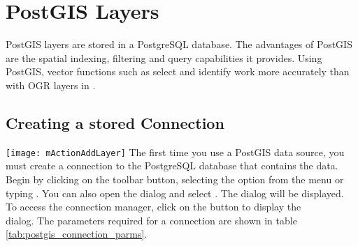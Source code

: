 \section{PostGIS Layers}
\label{label_postgis}

PostGIS layers are stored in a PostgreSQL database. The advantages of PostGIS
are the spatial indexing, filtering and query capabilities it provides. Using PostGIS,
vector functions such as select and identify work more accurately than with
OGR layers in \qg.

\subsection{Creating a stored
Connection}\label{sec:postgis_stored}

\texttt{[image: mActionAddLayer]} The first time
you use a PostGIS data source, you must create a connection to the PostgreSQL
database that contains the data. Begin by clicking on the
 toolbar button, selecting the
 option from the
 menu or typing . You can also
open the  dialog and select .
The  dialog will
be displayed. To access the connection manager, click on the  button to display the \\
 dialog. The parameters required for
a connection are shown in table \ref{tab:postgis_connection_parms}.

